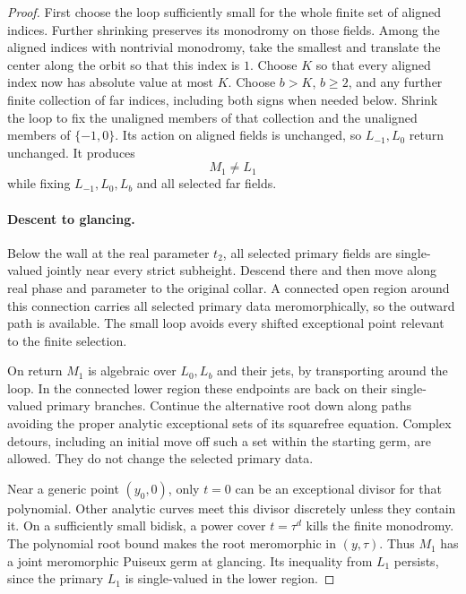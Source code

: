 \begin{proof}
First choose the loop sufficiently small for the whole finite
set of aligned indices. Further shrinking preserves its
monodromy on those fields. Among the aligned indices with
nontrivial monodromy, take the smallest and translate the
center along the orbit so that this index is \(1\). Choose
\(K\) so that every aligned index now has absolute value at
most \(K\). Choose \(b>K\), \(b\ge2\), and any further finite
collection of far indices, including both signs when needed
below. Shrink the loop to fix the unaligned members of that
collection and the unaligned members of \(\{-1,0\}\). Its
action on aligned fields is unchanged, so \(L_{-1},L_0\)
return unchanged. It produces
\begin{equation}
 M_1\ne L_1
 \label{cont:alternate-line}
\end{equation}
while fixing \(L_{-1},L_0,L_b\) and all selected far fields.

\paragraph{Descent to glancing.}
Below the wall at the real parameter \(t_2\), all selected
primary fields are single-valued jointly near every strict
subheight.  Descend there and then move along real phase
and parameter to the original collar.  A connected open
region around this connection carries all selected primary
data meromorphically, so the outward path is available.
The small loop avoids every shifted exceptional point
relevant to the finite selection.

On return \(M_1\) is algebraic over \(L_0,L_b\) and their
jets, by transporting  around the loop.
In the connected lower region these endpoints are back
on their single-valued primary branches.  Continue the
alternative root down along paths avoiding the proper
analytic exceptional sets of its squarefree equation.
Complex detours, including an initial move off such a
set within the starting germ, are allowed.  They do not
change the selected primary data.

Near a generic point \((y_0,0)\), only \(t=0\) can be an
exceptional divisor for that polynomial.  Other analytic
curves meet this divisor discretely unless they contain it.
On a sufficiently small bidisk, a power cover \(t=\tau^d\)
kills the finite monodromy.  The polynomial root bound
makes the root meromorphic in \((y,\tau)\).  Thus \(M_1\)
has a joint meromorphic Puiseux germ at glancing.
Its inequality from \(L_1\) persists, since the primary
\(L_1\) is single-valued in the lower region.


\end{proof}
